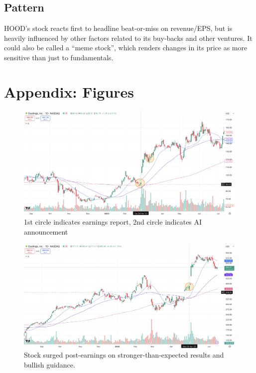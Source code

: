 \documentclass[11pt]{article}
\begin{document}
    \subsection{Pattern}
        HOOD's stock reacts first to headline beat-or-miss on revenue/EPS, but is heavily influenced by other factors related to its buy-backs and other ventures. It could also be called a ``meme stock'', which renders changes in its price as more sensitive than just to fundamentals.

\newpage
\section{Appendix: Figures}
    \begin{figure}[H]
        \centering
        \includegraphics[width=1.0\linewidth]{images/DUOL1.png}
        \caption{1st circle indicates earnings report, 2nd circle indicates AI announcement}
        \label{fig:DUOL1}
    \end{figure}
    \begin{figure}[H]
        \centering 
        \includegraphics[width=1.0\linewidth]{images/DUOL2.png}
        \caption{Stock surged post-earnings on stronger-than-expected results and bullish guidance.}
        \label{fig:DUOL2}
    \end{figure}
\end{document}
